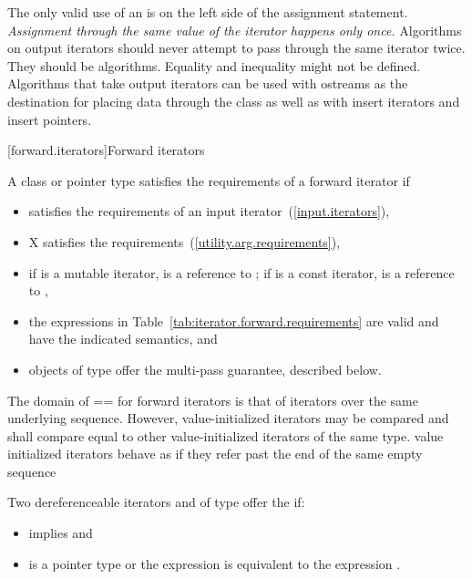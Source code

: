 \pnum
\enternote
The only valid use of an
is on the left side of the assignment statement.
\textit{Assignment through the same value of the iterator happens only once.}
Algorithms on output iterators should never attempt to pass through the same iterator twice.
They should be
algorithms.
Equality and inequality might not be defined.
Algorithms that take output iterators can be used with ostreams as the destination
for placing data through the
class as well as with insert iterators and insert pointers.
\exitnote

[forward.iterators]{Forward iterators}

\pnum
A class or pointer type
satisfies the requirements of a forward iterator if

\begin{itemize}
\item {} satisfies the requirements of an input iterator~(\ref{input.iterators}),

\item X satisfies the 
requirements~(\ref{utility.arg.requirements}),

\item if  is a mutable iterator,  is a reference to ;
if  is a const iterator,  is a reference to ,

\item the expressions in Table~\ref{tab:iterator.forward.requirements}
are valid and have the indicated semantics, and

\item objects of type  offer the multi-pass guarantee, described below.
\end{itemize}

\pnum
The domain of == for forward iterators is that of iterators over the same
underlying sequence. However, value-initialized iterators may be compared and
shall compare equal to other value-initialized iterators of the same type.
\enternote value initialized iterators behave as if they refer past the end of
the same empty sequence \exitnote

\pnum
Two dereferenceable iterators  and  of type  offer the
 if:

\begin{itemize}
\item {} implies  and
\item {} is a pointer type or the expression
 is equivalent to the expression .
\end{itemize}

